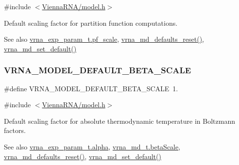 {\ttfamily \#include $<$\mbox{\hyperlink{model_8h}{Vienna\+R\+N\+A/model.\+h}}$>$}



Default scaling factor for partition function computations. 

\begin{DoxySeeAlso}{See also}
\mbox{\hyperlink{group__energy__parameters_a53c12f0d74f94ce371e0471a8ab5a377}{vrna\+\_\+exp\+\_\+param\+\_\+t.\+pf\+\_\+scale}}, \mbox{\hyperlink{group__model__details_ga70834424cf804d149937de89f80ceb45}{vrna\+\_\+md\+\_\+defaults\+\_\+reset()}}, \mbox{\hyperlink{group__model__details_ga8ac6ff84936282436f822644bf841f66}{vrna\+\_\+md\+\_\+set\+\_\+default()}} 
\end{DoxySeeAlso}
\mbox{\label{group__model__details_ga383d3ac8d08c3b6221754b50871c1200}} 
\subsubsection{\texorpdfstring{VRNA\_MODEL\_DEFAULT\_BETA\_SCALE}{VRNA\_MODEL\_DEFAULT\_BETA\_SCALE}}
{\footnotesize\ttfamily \#define V\+R\+N\+A\+\_\+\+M\+O\+D\+E\+L\+\_\+\+D\+E\+F\+A\+U\+L\+T\+\_\+\+B\+E\+T\+A\+\_\+\+S\+C\+A\+LE~1.}



{\ttfamily \#include $<$\mbox{\hyperlink{model_8h}{Vienna\+R\+N\+A/model.\+h}}$>$}



Default scaling factor for absolute thermodynamic temperature in Boltzmann factors. 

\begin{DoxySeeAlso}{See also}
\mbox{\hyperlink{group__energy__parameters_a77145830b7bb01b36c3217b363310ef0}{vrna\+\_\+exp\+\_\+param\+\_\+t.\+alpha}}, \mbox{\hyperlink{group__model__details_a19524bf1d8d7ab590ed36edbbcaaba2c}{vrna\+\_\+md\+\_\+t.\+beta\+Scale}}, \mbox{\hyperlink{group__model__details_ga70834424cf804d149937de89f80ceb45}{vrna\+\_\+md\+\_\+defaults\+\_\+reset()}}, \mbox{\hyperlink{group__model__details_ga8ac6ff84936282436f822644bf841f66}{vrna\+\_\+md\+\_\+set\+\_\+default()}} 
\end{DoxySeeAlso}
\mbox{\label{group__model__details_ga2aa7bc2cae774b83a5c468f824c27a42}} 
